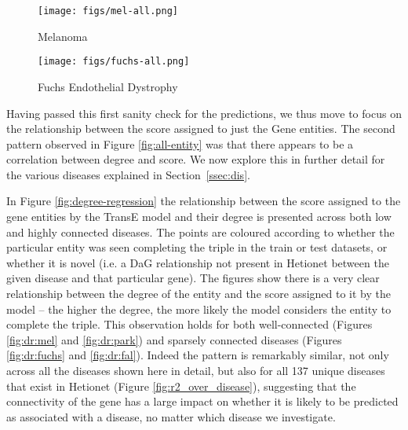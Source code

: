\begin{figure*}[!th]
	\centering
	\begin{subfigure}[b]{0.48\textwidth}
		\centering
		\texttt{[image: figs/mel-all.png]}
		\caption{Melanoma}\label{fig:ae:mel}
	\end{subfigure}
	\begin{subfigure}[b]{0.48\textwidth}
		\centering
		\texttt{[image: figs/fuchs-all.png]}
		\caption{Fuchs Endothelial Dystrophy}\label{fig:ae:fuchs}
	\end{subfigure}
	\caption{Predicted score for each entity using TransE when completing the partial triple (Disease, DaG, ?) versus the degree of the entity. Points are styled by entity type. The higher the score, the more likely the model considers the entity and being the correct one to complete the triple.}
	\label{fig:all-entity}
\end{figure*}

Having passed this first sanity check for the predictions, we thus move to focus on the relationship between the score assigned to just the Gene entities. The second pattern observed in Figure \ref{fig:all-entity} was that there appears to be a correlation between degree and score. We now explore this in further detail for the various diseases explained in Section~\ref{ssec:dis}.

In Figure \ref{fig:degree-regression} the relationship between the score assigned to the gene entities by the TransE model and their degree is presented across both low and highly connected diseases. The points are coloured according to whether the particular entity was seen completing the triple in the train or test datasets, or whether it is novel (i.e. a DaG relationship not present in Hetionet between the given disease and that particular gene). The figures show there is a very clear relationship between the degree of the entity and the score assigned to it by the model -- the higher the degree, the more likely the model considers the entity to complete the triple. This observation holds for both well-connected (Figures \ref{fig:dr:mel} and \ref{fig:dr:park}) and sparsely connected diseases (Figures \ref{fig:dr:fuchs} and \ref{fig:dr:fal}). Indeed the pattern is remarkably similar, not only across all the diseases shown here in detail, but also for all 137 unique diseases that exist in Hetionet (Figure \ref{fig:r2_over_disease}), suggesting that the connectivity of the gene has a large impact on whether it is likely to be predicted as associated with a disease, no matter which disease we investigate.

